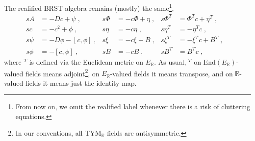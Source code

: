 \documentclass[../main.tex]{subfiles}
\begin{document}
The realified BRST algebra remains (mostly) the same\footnote{From now on, we omit the realified label  whenever there is a risk of cluttering equations.},
\begin{subequations}%
  \label{eq:real-brst}
  \begin{align}
    s A    & = - Dc + \psi \;,         & s \Phi & = - c \Phi + \eta \;, & s \Phi^{T} & = \Phi^{T} c + \eta^{T} \;,            & \hspace{0pt} \\
    s c    & = - c^2 + \phi  \;,       & s \eta & = - c \eta  \;,       & s \eta^{T} & =  - \eta^{T} c                 \;,    & \hspace{0pt} \\
    s \psi & = -D \phi - [c, \phi] \;, & s \xi  & = - c \xi + B \;,     & s \xi^{T}  & = - \xi^{T} c + B^{T}              \;, & \hspace{0pt} \\
    s \phi & = - [c, \phi]  \;,        & s B    & = - c B  \;,          & s B^{T}    & = B^{T} c                  \;,         & \hspace{0pt}
  \end{align}
\end{subequations}
where ${}^{T}$ is defined via the Euclidean metric on $E_{\mathbb{R}}$. As usual, ${}^{T}$ on $\mathrm{End}(E_{\mathbb{R}})$-valued fields means adjoint\footnote{In our conventions, all TYM$_{\mathbb{R}}$ fields are antisymmetric.}, on $E_{\mathbb{R}}$-valued fields it means transpose, and on $\mathbb{R}$-valued fields it means just the identity map.
\end{document}

